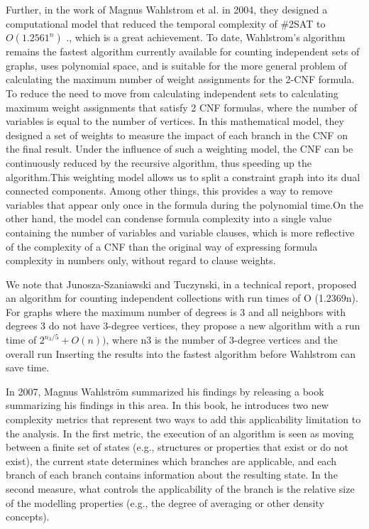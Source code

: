 \documentclass{sigchi}
\begin{document}
Further, in the work of Magnus Wahlstrom et al. in 2004, they designed a computational model that reduced the temporal complexity of \#2SAT to  $ O\left ( 1.2561^{n} \right )$ \cite{10.1016/j.tcs.2004.10.037}., which is a great achievement. To date, Wahlstrom's algorithm remains the fastest algorithm currently available for counting independent sets of graphs, uses polynomial space, and is suitable for the more general problem of calculating the maximum number of weight assignments for the 2-CNF formula. To reduce the need to move from calculating independent sets to calculating maximum weight assignments that satisfy 2 CNF formulas, where the number of variables is equal to the number of vertices. In this mathematical model, they designed a set of weights to measure the impact of each branch in the CNF on the final result. Under the influence of such a weighting model, the CNF can be continuously reduced by the recursive algorithm, thus speeding up the algorithm.This weighting model allows us to split a constraint graph into its dual connected components. Among other things, this provides a way to remove variables that appear only once in the formula during the polynomial time.On the other hand, the model can condense formula complexity into a single value containing the number of variables and variable clauses, which is more reflective of the complexity of a CNF than the original way of expressing formula complexity in numbers only, without regard to clause weights.

We note that Junosza-Szaniawski and Tuczynski, in a technical report, proposed an algorithm for counting independent collections with run times of O (1.2369n).\cite{undefined} For graphs where the maximum number of degrees is 3 and all neighbors with degrees 3 do not have 3-degree vertices, they propose a new algorithm with a run time of $2^{n_{3}/5} +O\left( n \right))$, where n3 is the number of 3-degree vertices and the overall run Inserting the results into the fastest algorithm before Wahlstrom \cite{10.1016/j.tcs.2004.10.037} can save time.

In 2007, Magnus Wahlström summarized his findings by releasing a book summarizing his findings in this area.\cite{Wahlstrom} In this book, he introduces two new complexity metrics that represent two ways to add this applicability limitation to the analysis. In the first metric, the execution of an algorithm is seen as moving between a finite set of states (e.g., structures or properties that exist or do not exist), the current state determines which branches are applicable, and each branch of each branch contains information about the resulting state. In the second measure, what controls the applicability of the branch is the relative size of the modelling properties (e.g., the degree of averaging or other density concepts).
\end{document}
